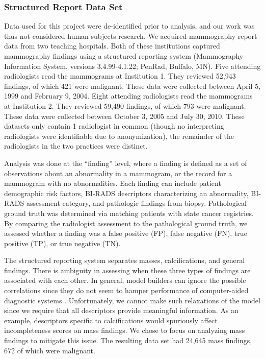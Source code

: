 \subsubsection{Structured Report Data Set}
Data used for this project were de-identified prior to analysis, and our work was thus not considered human subjects research. We acquired mammography report data from two teaching hospitals. Both of these institutions captured mammography findings using a structured reporting system (Mammography Information System, versions 3.4.99-4.1.22; PenRad, Buffalo, MN). Five attending radiologists read the mammograms at Institution 1. They reviewed 52,943 findings, of which 421 were malignant. These data were collected between April 5, 1999 and February 9, 2004. Eight attending radiologists read the mammograms at Institution 2. They reviewed 59,490 findings, of which 793 were malignant. These data were collected between October 3, 2005 and July 30, 2010. These datasets only contain 1 radiologist in common (though no interpreting radiologists were identifiable due to anonymization), the remainder of the radiologists in the two practices were distinct.

Analysis was done at the ``finding'' level, where a finding is defined as a set of observations about an abnormality in a mammogram, or the record for a mammogram with no abnormalities. Each finding can include patient demographic risk factors, BI-RADS descriptors characterizing an abnormality, BI-RADS assessment category, and pathologic findings from biopsy. Pathological ground truth was determined via matching patients with state cancer registries. By comparing the radiologist assessment to the pathological ground truth, we assessed whether a finding was a false positive (FP), false negative (FN), true positive (TP), or true negative (TN).

The structured reporting system separates masses, calcifications, and general findings. There is ambiguity in assessing when these three types of findings are associated with each other. In general, model builders can ignore the possible correlations since they do not seem to hamper performance of computer-aided diagnostic systems \cite{Burnside:2000wl, ElizabethS:2005gc, Burnside:2009br}. Unfortunately, we cannot make such relaxations of the model since we require that all descriptors provide meaningful information. As an example, descriptors specific to calcifications would spuriously affect incompleteness scores on mass findings. We chose to focus on analyzing mass findings to mitigate this issue. The resulting data set had 24,645 mass findings, 672 of which were malignant.

